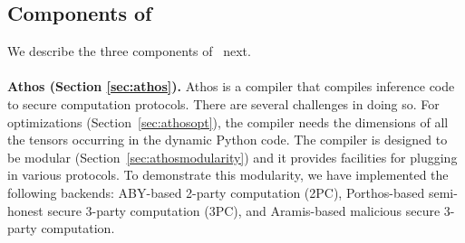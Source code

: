 \subsection{Components of \cryptflow}
We describe the three components of \cryptflow\ next.
\\\\
\noindent\textbf{Athos (Section \ref{sec:athos}).} Athos is a compiler that compiles \tensorflow inference code to secure computation protocols. There are several challenges in doing so. For optimizations  (Section~\ref{sec:athosopt}), the compiler needs the dimensions of all the tensors occurring in the dynamic Python code.
The compiler is designed to be modular (Section~\ref{sec:athosmodularity}) and it provides facilities for plugging in various \mpc protocols.
To demonstrate this modularity, we have implemented the following backends: ABY-based  2-party computation (2PC), Porthos-based semi-honest secure 3-party computation (3PC), and Aramis-based  malicious secure 3-party computation. 

